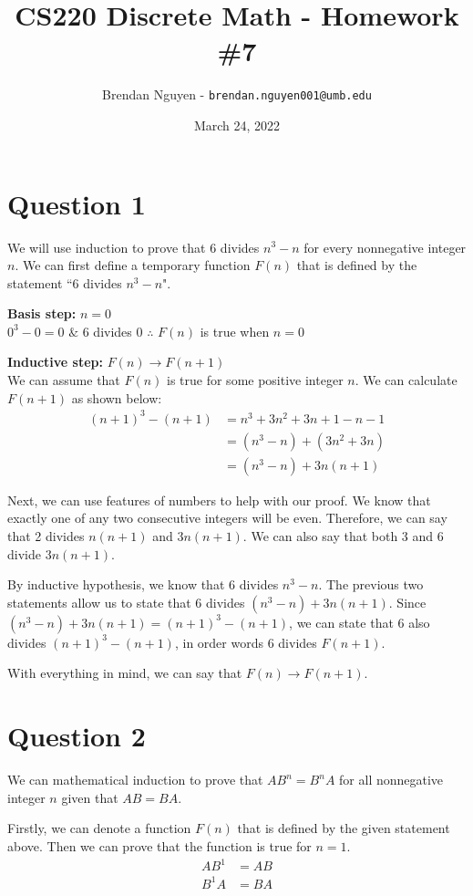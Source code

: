 \documentclass[11pt]{article}
\title{CS220 Discrete Math - Homework \#7}
\author{Brendan Nguyen - \texttt{brendan.nguyen001@umb.edu}}
\date{March 24, 2022}
\begin{document}
\maketitle

\section*{Question 1}
We will use induction to prove that 6 divides $n^3 - n$ for every nonnegative integer $n$. We can first define a temporary function $F(n)$ that is defined by the statement ``6 divides $n^3 - n$".

\textbf{Basis step: } $n = 0$\\
$0^3 - 0 = 0$ $\&$ 6 divides 0 $\therefore$ $F(n)$ is true when $n = 0$

\textbf{Inductive step: } $F(n) \to F(n + 1)$\\
We can assume that $F(n)$ is true for some positive integer $n$. We can calculate $F(n + 1)$ as shown below:
\begin{align*}
    (n + 1)^3 - (n + 1) &= n^3 + 3n^2 + 3n + 1 - n - 1\\
    &= (n^3 - n) + (3n^2 + 3n)\\
    &= (n^3 - n) + 3n(n+1)
\end{align*}

Next, we can use features of numbers to help with our proof. We know that exactly one of any two consecutive integers will be even. Therefore, we can say that 2 divides $n(n + 1)$ and $3n(n + 1)$. We can also say that both 3 and 6 divide $3n(n+1)$. 

By inductive hypothesis, we know that 6 divides $n^3 - n$. The previous two statements allow us to state that 6 divides $(n^3 - n) + 3n(n+1)$. Since $(n^3 - n) + 3n(n+1) = (n + 1)^3 - (n + 1)$, we can state that 6 also divides $(n + 1)^3 - (n + 1)$, in order words 6 divides $F(n + 1)$.

With everything in mind, we can say that $F(n) \to F(n + 1)$.

\section*{Question 2}
We can mathematical induction to prove that $AB^n = B^nA$ for all nonnegative integer $n$ given that $AB = BA$. 

Firstly, we can denote a function $F(n)$ that is defined by the given statement above. Then we can prove that the function is true for $n = 1$.
\begin{align*}
    AB^1 &= AB\\
    B^1A &= BA
\end{align*}
\end{document}
